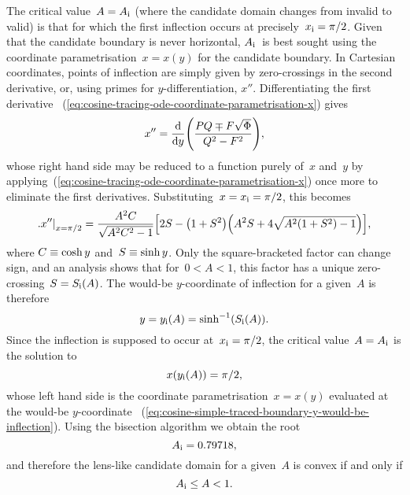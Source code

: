 The critical value~$A = A_{\mathrm{i}}$
(where the candidate domain changes from invalid to valid)
is that for which the first inflection occurs at precisely~$x_{\mathrm{i}} = \pi/2$.
Given that the candidate boundary is never horizontal,
$A_{\mathrm{i}}$~is best sought using the coordinate parametrisation~$x = x (y)$
for the candidate boundary.
In Cartesian coordinates, points of inflection
are simply given by zero-crossings in the second derivative,
or, using primes for $y$-differentiation, $x''$.
Differentiating the first derivative~%
  (\ref{eq:cosine-tracing-ode-coordinate-parametrisation-x})
gives
\begin{equation}
  x'' = \tder{}{y} \roundbr*{\frac{P Q \mp F \sqrt{\Phi}}{Q^2 - F^2}},
  \label{eq:acceleration-traced-boundary-cartesian-by-y}
\end{equation}
whose right hand side may be reduced to a function purely of~$x$ and~$y$
by applying~(\ref{eq:cosine-tracing-ode-coordinate-parametrisation-x})
once more to eliminate the first derivatives.
Substituting~$x = x_{\mathrm{i}} = \pi/2$, this becomes
\begin{equation}
  \eval[\textsize]{x''}_{x=\pi/2} =
    \frac{A^2 C}{\sqrt{A^2 C^2 - 1}}
    \squarebr*{
      2 S - \roundbr*{1 + S^2} \roundbr*{A^2 S + 4 \sqrt{A^2 (1 + S^2) - 1}}
    },
  \label{eq:%
    cosine-simple-traced-boundary-acceleration-cartesian-by-y-inflection%
  }
\end{equation}
where $C \equiv \cosh y$ and~$S \equiv \sinh y$.
Only the square-bracketed factor can change sign,
and an analysis shows that for~$0 < A < 1$,
this factor has a unique zero-crossing~$S = S_{\mathrm{i}} (A)$.
The would-be $y$-coordinate of inflection for a given~$A$ is therefore
\begin{equation}
  y = y_\infl (A) = \sinh^{-1} \roundbr[\bulkysize]{S_\infl (A)}.
  \label{eq:cosine-simple-traced-boundary-y-would-be-inflection}
\end{equation}
Since the inflection is supposed to occur at~$x_{\mathrm{i}} = \pi/2$,
the critical value~$A = A_{\mathrm{i}}$ is the solution to
\begin{equation}
  x \roundbr[\bulkysize]{y_\infl (A)} = \pi/2,
  \label{eq:cosine-simple-traced-boundary-a-inflection-equation}
\end{equation}
whose left hand side is the coordinate parametrisation~$x = x (y)$
evaluated at the would-be $y$-coordinate~%
  (\ref{eq:cosine-simple-traced-boundary-y-would-be-inflection}).
Using the bisection algorithm we obtain the root
\begin{equation}
  A_{\mathrm{i}} = 0.79718,
  \label{eq:cosine-simple-traced-boundary-a-inflection}
\end{equation}
and therefore the lens-like candidate domain for a given~$A$ is convex
if and only if
\begin{equation}
  A_{\mathrm{i}} \le A < 1.
  \label{eq:cosine-simple-traced-boundary-convex-a-interval}
\end{equation}

